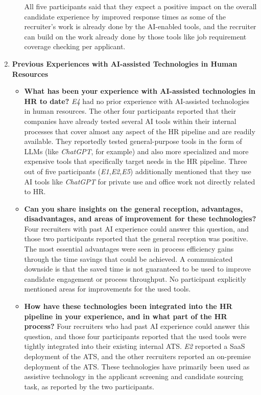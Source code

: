 \documentclass[draft,final]{thesisclass} %
\begin{document}
\begin{enumerate}
\begin{itemize}
        All five participants said that they expect a positive impact on the overall candidate experience by improved response times as some of the recruiter's work is already done by the \acs{AI}-enabled tools, and the recruiter can build on the work already done by those tools like job requirement coverage checking per applicant.
    \end{itemize}
    \item \textbf{Previous Experiences with \acs{AI}-assisted Technologies in Human Resources}
    \begin{itemize}
        \item \textbf{What has been your experience with \acs{AI}-assisted technologies in \acs{HR} to date?}
        \textit{E4} had no prior experience with \acs{AI}-assisted technologies in human resources. The other four participants reported that their companies have already tested several \acs{AI} tools within their internal processes that cover almost any aspect of the \acs{HR} pipeline and are readily available. They reportedly tested general-purpose tools in the form of \gls{LLM}s (like \textit{ChatGPT}, for example) and also more specialized and more expensive tools that specifically target needs in the \acs{HR} pipeline. Three out of five participants (\textit{E1},\textit{E2},\textit{E5}) additionally mentioned that they use \acs{AI} tools like \textit{ChatGPT} for private use and office work not directly related to \acs{HR}.
        \item \textbf{Can you share insights on the general reception, advantages, disadvantages, and areas of improvement for these technologies?}
        Four recruiters with past \acs{AI} experience could answer this question, and those two participants reported that the general reception was positive. The most essential advantages were seen in process efficiency gains through the time savings that could be achieved. A communicated downside is that the saved time is not guaranteed to be used to improve candidate engagement or process throughput. No participant explicitly mentioned areas for improvements for the used tools.
        \item \textbf{How have these technologies been integrated into the \acs{HR} pipeline in your experience, and in what part of the \acs{HR} process?}
        Four recruiters who had past \acs{AI} experience could answer this question, and those four participants reported that the used tools were tightly integrated into their existing internal \acs{ATS}. \textit{E2} reported a \acs{SaaS} deployment of the \acs{ATS}, and the other recruiters reported an on-premise deployment of the \acs{ATS}. These technologies have primarily been used as assistive technology in the applicant screening and candidate sourcing task, as reported by the two participants.

\end{itemize}
\end{enumerate}
\end{document}
